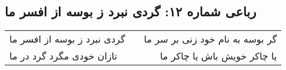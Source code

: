 \begin{center}
\section*{رباعی شماره ۱۲: گردی نبرد ز بوسه از افسر ما}
\label{sec:sh012}
\begin{longtable}{l p{0.5cm} r}
گردی نبرد ز بوسه از افسر ما
&&
گر بوسه به نام خود زنی بر سر ما
\\
تازان خودی مگرد گرد در ما
&&
یا چاکر خویش باش یا چاکر ما
\\
\end{longtable}
\end{center}
